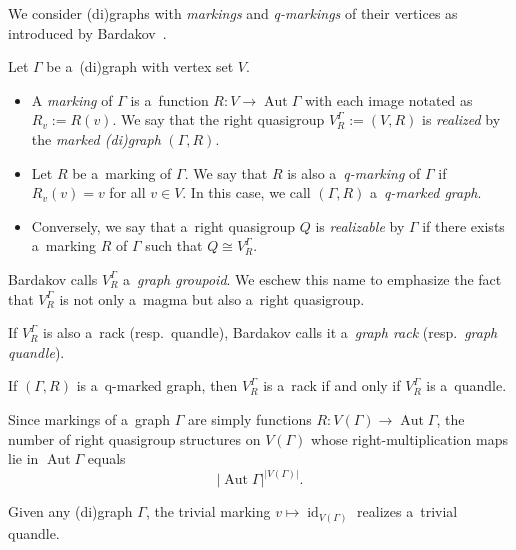 \documentclass{jonasart}
\DeclareMathOperator{\Aut}{Aut}
\DeclareMathOperator{\id}{id}
\begin{document}
	We consider (di)graphs with \emph{markings} and \emph{q-markings} of their vertices as introduced by Bardakov~\cite{bardakov}.

	\begin{definition}
		Let $\Gamma$ be a~(di)graph with vertex set $V$.
		\begin{itemize}
			\item A \emph{marking} of $\Gamma$ is a~function $R:V\to \Aut \Gamma$ with each image notated as $R_v:=R(v)$. We say that the right quasigroup $V_R^\Gamma:=(V,R)$ is \emph{realized} by the \emph{marked \textup{(}di\textup{)}graph} $(\Gamma, R)$.
			\item Let $R$ be a~marking of $\Gamma$. We say that $R$ is also a~\emph{q-marking} of $\Gamma$ if $R_v (v)=v$ for all $v\in V$. In this case, we call $(\Gamma,R)$ a~\emph{q-marked graph}.
			\item Conversely, we say that a~right quasigroup $Q$ is \emph{realizable} by $\Gamma$ if there exists a~marking $R$ of $\Gamma$ such that $Q\cong V_R^\Gamma$.
		\end{itemize}
	\end{definition}

	\begin{remark}
		Bardakov calls $V_R^\Gamma$ a~\emph{graph groupoid}. We eschew this name to emphasize the fact that $V_R^\Gamma$ is not only a~magma but also a~right quasigroup.

		If $V_R^\Gamma$ is also a~rack (resp.\ quandle), Bardakov calls it a~\emph{graph rack} (resp.\ \emph{graph quandle}).
	\end{remark}

	\begin{remark}\label{obs:q}
		If $(\Gamma,R)$ is a~q-marked graph, then $V^\Gamma_R$ is a~rack if and only if $V^\Gamma_R$ is a~quandle.
	\end{remark}

	\begin{remark}
		Since markings of a~graph $\Gamma$ are simply functions $R:V(\Gamma)\to\Aut\Gamma$, the number of right quasigroup structures on $V(\Gamma)$ whose right-multiplication maps lie in $\Aut\Gamma$ equals
		\[
			\lvert\Aut\Gamma\rvert^{|V(\Gamma)|}.
		\]
	\end{remark}

	\begin{example}
		Given any (di)graph $\Gamma$, the trivial marking $v\mapsto \id_{V(\Gamma)}$ realizes a~trivial quandle.
	\end{example}
\end{document}
